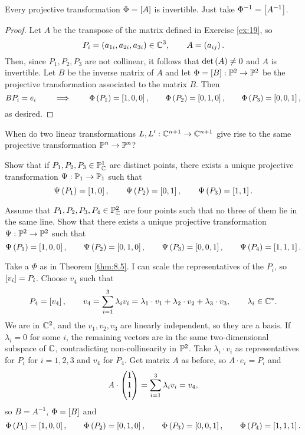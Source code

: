 \begin{remark*}
Every projective transformation $ \Phi = \sb{A} $ is invertible. Just take $ \Phi^{-1} = \sb{A^{-1}} $.
\end{remark*}

\begin{proof}
Let $ A $ be the transpose of the matrix defined in Exercise \ref{ex:19}, so
$$ P_i = \rb{a_{1i}, a_{2i}, a_{3i}} \in \C^3, \qquad A = \rb{a_{ij}}. $$
Then, since $ P_1, P_2, P_3 $ are not collinear, it follows that $ \det\rb{A} \ne 0 $ and $ A $ is invertible. Let $ B $ be the inverse matrix of $ A $ and let $ \Phi = \sb{B} : \P^2 \to \P^2 $ be the projective transformation associated to the matrix $ B $. Then
$$ BP_i = e_i \qquad \implies \qquad \Phi\rb{P_1} = \sb{1, 0, 0}, \qquad \Phi\rb{P_2} = \sb{0, 1, 0}, \qquad \Phi\rb{P_3} = \sb{0, 0, 1}, $$
as desired.
\end{proof}

\begin{exercise}
When do two linear transformations $ L, L' : \C^{n + 1} \to \C^{n + 1} $ give rise to the same projective transformation $ \P^n \to \P^n $?
\end{exercise}

\begin{exercise}
Show that if $ P_1, P_2, P_3 \in \P^1_\C $ are distinct points, there exists a unique projective transformation $ \Psi : \P_1 \to \P_1 $ such that
$$ \Psi\rb{P_1} = \sb{1, 0}, \qquad \Psi\rb{P_2} = \sb{0, 1}, \qquad \Psi\rb{P_3} = \sb{1, 1}. $$
\end{exercise}

\begin{exercise}
Assume that $ P_1, P_2, P_3, P_4 \in \P^2_\C $ are four points such that no three of them lie in the same line. Show that there exists a unique projective transformation $ \Psi : \P^2 \to \P^2 $ such that
$$ \Psi\rb{P_1} = \sb{1, 0, 0}, \qquad \Psi\rb{P_2} = \sb{0, 1, 0}, \qquad \Psi\rb{P_3} = \sb{0, 0, 1}, \qquad \Psi\rb{P_4} = \sb{1, 1, 1}. $$

\pagebreak

Take a $ \Phi $ as in Theorem \ref{thm:8.5}. I can scale the representatives of the $ P_i $, so $ \sb{v_i} = P_i $. Choose $ v_4 $ such that
$$ P_4 = \sb{v_4}, \qquad v_4 = \sum_{i = 1}^3 \lambda_i v_i = \lambda_1 \cdot v_1 + \lambda_2 \cdot v_2 + \lambda_3 \cdot v_3, \qquad \lambda_i \in \C^*. $$
We are in $ \C^2 $, and the $ v_1, v_2, v_3 $ are linearly independent, so they are a basis. If $ \lambda_i = 0 $ for some $ i $, the remaining vectors are in the same two-dimensional subspace of $ \C $, contradicting non-collinearity in $ \P^2 $. Take $ \lambda_i \cdot v_i $ as representatives for $ P_i $ for $ i = 1, 2, 3 $ and $ v_4 $ for $ P_4 $. Get matrix $ A $ as before, so $ A \cdot e_i = P_i $ and
$$ A \cdot \threebyone{1}{1}{1} = \sum_{i = 1}^3 \lambda_iv_i = v_4, $$
so $ B = A^{-1} $, $ \Phi = \sb{B} $ and
$$ \Phi\rb{P_1} = \sb{1, 0, 0}, \qquad \Phi\rb{P_2} = \sb{0, 1, 0}, \qquad \Phi\rb{P_3} = \sb{0, 0, 1}, \qquad \Phi\rb{P_4} = \sb{1, 1, 1}. $$
\end{exercise}

